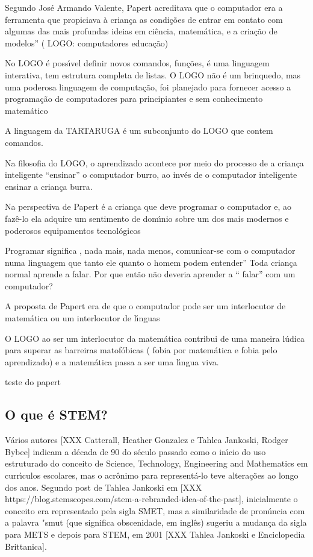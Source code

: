 \documentclass[
12pt,		%
openright,	%
twoside,  %
a4paper,			%
chapter=TITLE,		%
english,			%
french,				%
spanish,			%
brazil				%
]{USPSC-classe/USPSC}
\begin{document}
Segundo Jos\'e Armando Valente, Papert acreditava que o computador era a ferramenta que propiciava \`a crian\c{c}a as condi\c{c}\~oes de entrar em contato com algumas das mais profundas ideias em ci\^encia, matem\'atica, e a cria\c{c}\~ao de modelos” ( LOGO: computadores  educa\c{c}\~ao)


 No LOGO \'e poss\'{\i}vel definir novos comandos, fun\c{c}\~oes, \'e uma linguagem interativa, tem estrutura completa de listas.  O LOGO n\~ao \'e um brinquedo,  mas uma poderosa linguagem de computa\c{c}\~ao, foi planejado para fornecer acesso a programa\c{c}\~ao de computadores para principiantes e sem conhecimento matem\'atico


A linguagem da TARTARUGA \'e um subconjunto do LOGO que contem comandos.


Na filosofia do LOGO, o aprendizado acontece por meio do  processo de a crian\c{c}a inteligente “ensinar” o computador burro, ao inv\'es de o  computador inteligente ensinar a crian\c{c}a burra.


Na perspectiva de Papert \'e a crian\c{c}a que deve programar o computador e, ao faz\^e-lo ela adquire um sentimento de dom\'{\i}nio sobre um dos mais  modernos e poderosos equipamentos tecnol\'ogicos


Programar significa , nada mais, nada menos, comunicar-se com o computador numa linguagem que tanto ele quanto o homem podem entender” Toda crian\c{c}a normal aprende a falar.  Por que ent\~ao n\~ao deveria aprender a “ falar” com um computador?


A proposta de Papert era de que  o computador pode ser um interlocutor  de matem\'atica ou um interlocutor de l\'{\i}nguas


O LOGO ao ser um interlocutor da matem\'atica contribui de uma maneira l\'udica para superar as barreiras matof\'obicas  ( fobia por matem\'atica e fobia pelo aprendizado) e a matem\'atica passa a ser uma l\'{\i}ngua viva.


teste do papert


\subsection[O que \'e STEM?]{O que \'e STEM?}\label{O que \'e STEM?}
V\'arios autores [XXX Catterall, Heather Gonzalez e  Tahlea Jankoski, Rodger Bybee] indicam a d\'ecada de 90 do s\'eculo passado como o in\'{\i}cio do uso estruturado do conceito de Science, Technology, Engineering and Mathematics em curr\'{\i}culos escolares, mas o acr\^onimo para represent\'a-lo teve altera\c{c}\~oes ao longo dos anos. Segundo post de Tahlea Jankoski em [XXX https://blog.stemscopes.com/stem-a-rebranded-idea-of-the-past], inicialmente o conceito era representado pela sigla SMET, mas a similaridade de pron\'uncia com a palavra "smut (que significa obscenidade, em ingl\^es) sugeriu a mudan\c{c}a da sigla para METS e depois para STEM, em 2001 [XXX Tahlea Jankoski e Enciclopedia Brittanica]. 
\end{document}
